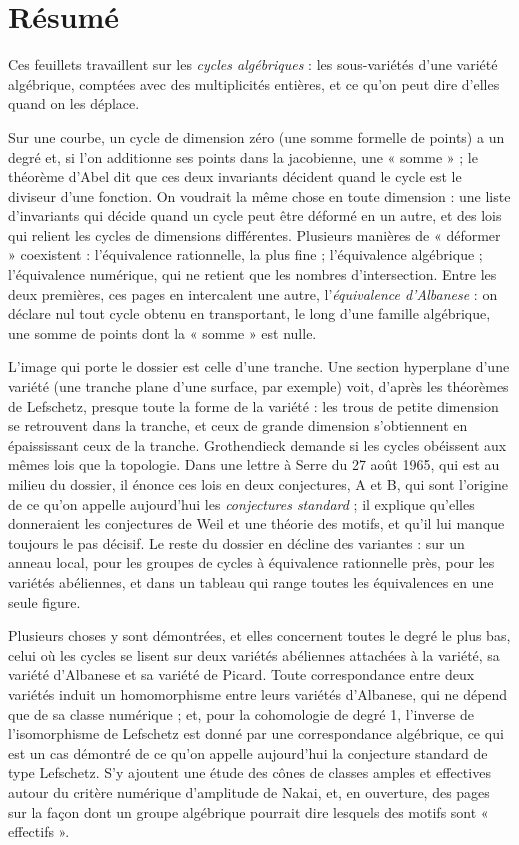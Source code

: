 \documentclass[11pt,a4paper]{article}
\begin{document}
\section*{Résumé}

\begin{resume}
Ces feuillets travaillent sur les \emph{cycles algébriques} : les
sous-variétés d'une variété algébrique, comptées avec des multiplicités
entières, et ce qu'on peut dire d'elles quand on les déplace.

Sur une courbe, un cycle de dimension zéro (une somme
formelle de points) a un degré et, si l'on additionne ses points dans la
jacobienne, une « somme » ; le théorème d'Abel dit que ces deux invariants
décident quand le cycle est le diviseur d'une fonction. On voudrait
la même chose en toute dimension : une liste d'invariants qui décide quand un
cycle peut être déformé en un autre, et des lois qui relient les cycles de
dimensions différentes. Plusieurs manières de « déformer » coexistent :
l'équivalence rationnelle, la plus fine ; l'équivalence algébrique ;
l'équivalence numérique, qui ne retient que les nombres d'intersection. Entre
les deux premières, ces pages en intercalent une autre, l'\emph{équivalence
d'Albanese} : on déclare nul tout cycle obtenu en transportant, le long d'une
famille algébrique, une somme de points dont la « somme » est nulle.

L'image qui porte le dossier est celle d'une tranche. Une section hyperplane
d'une variété (une tranche plane d'une surface, par exemple) voit,
d'après les théorèmes de Lefschetz, presque toute la forme de la variété : les
trous de petite dimension se retrouvent dans la tranche, et ceux de grande
dimension s'obtiennent en épaississant ceux de la tranche. Grothendieck
demande si les cycles obéissent aux mêmes lois que la topologie. Dans une
lettre à Serre du 27 août 1965, qui est au milieu du dossier, il énonce ces
lois en deux conjectures, A et B, qui sont l'origine de ce qu'on appelle
aujourd'hui les \emph{conjectures standard} ; il explique qu'elles donneraient
les conjectures de Weil et une théorie des motifs, et qu'il lui manque
toujours le pas décisif. Le reste du dossier en décline des variantes : sur un
anneau local, pour les groupes de cycles à équivalence rationnelle près, pour
les variétés abéliennes, et dans un tableau qui range toutes les équivalences
en une seule figure.

Plusieurs choses y sont démontrées, et elles concernent toutes le degré le plus
bas, celui où les cycles se lisent sur deux variétés abéliennes attachées à la
variété, sa variété d'Albanese et sa variété de Picard. Toute correspondance
entre deux variétés induit un homomorphisme entre leurs variétés d'Albanese,
qui ne dépend que de sa classe numérique ; et, pour la cohomologie de degré 1,
l'inverse de l'isomorphisme de Lefschetz est donné par une correspondance
algébrique, ce qui est un cas démontré de ce qu'on appelle aujourd'hui la conjecture
standard de type Lefschetz. S'y ajoutent une étude des cônes de classes amples
et effectives autour du critère numérique d'amplitude de Nakai, et, en
ouverture, des pages sur la façon dont un groupe algébrique pourrait dire
lesquels des motifs sont « effectifs ».


\end{resume}
\end{document}
